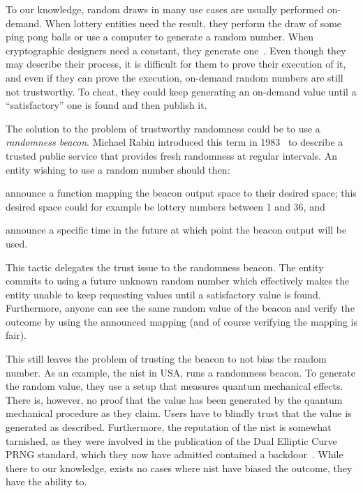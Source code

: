 To our knowledge, random draws in many use cases are usually performed on-demand.
When lottery entities need the result, they perform the draw of some ping pong balls or use a computer to generate a random number. When cryptographic designers need a constant, they generate one~\cite{baigneres2015trap}.
Even though they may describe their process, it is difficult for them to prove their execution of it, and even if they can prove the execution, on-demand random numbers are still not trustworthy. To cheat, they could keep generating an on-demand value until a \enquote{satisfactory} one is found and then publish it.

The solution to the problem of trustworthy randomness could be to use a \emph{randomness beacon}.
Michael Rabin introduced this term in 1983~\cite{rabin1983transaction} to describe a trusted public service that provides fresh randomness at regular intervals.
An entity wishing to use a random number should then:
\begin{eromanate*}
    \item announce a function mapping the beacon output space to their desired space; this desired space could for example be lottery numbers between 1 and 36, and
    \item announce a specific time in the future at which point the beacon output will be used.
\end{eromanate*}
This tactic delegates the trust issue to the randomness beacon.
The entity commits to using a future unknown random number which effectively makes the entity unable to keep requesting values until a satisfactory value is found.
Furthermore, anyone can see the same random value of the beacon and verify the outcome by using the announced mapping (and of course verifying the mapping is fair).

This still leaves the problem of trusting the beacon to not bias the random number.
As an example, the \gls{nist} in USA, runs a randomness beacon.
To generate the random value, they use a setup that measures quantum mechanical effects.
There is, however, no proof that the value has been generated by the quantum mechanical procedure as they claim.
Users have to blindly trust that the value is generated as described.
Furthermore, the reputation of the \gls{nist} is somewhat tarnished, as they were involved in the publication of the Dual Elliptic Curve PRNG standard, which they now have admitted contained a backdoor~\cite{nist2014backdoor}.
While there to our knowledge, exists no cases where \gls{nist} have biased the outcome, they have the ability to.

